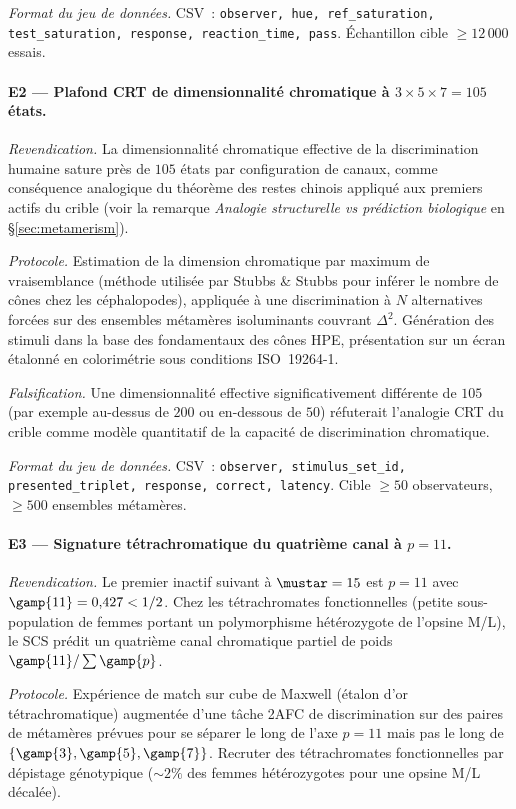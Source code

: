 \documentclass[12pt,a4paper]{article}
\begin{document}
\emph{Format du jeu de donn\'ees.} CSV~: \texttt{observer, hue,
ref\_saturation, test\_saturation, response, reaction\_time, pass}.
\'Echantillon cible $\geq 12\,000$ essais.

\paragraph{E2 --- Plafond CRT de dimensionnalit\'e chromatique
\`a $3 \times 5 \times 7 = 105$ \'etats.}
\emph{Revendication.} La dimensionnalit\'e chromatique effective de la
discrimination humaine sature pr\`es de $105$ \'etats par
configuration de canaux, comme cons\'equence analogique du th\'eor\`eme
des restes chinois appliqu\'e aux premiers actifs du crible (voir la
remarque \emph{Analogie structurelle vs pr\'ediction biologique} en
\S\ref{sec:metamerism}).

\emph{Protocole.} Estimation de la dimension chromatique par maximum
de vraisemblance (m\'ethode utilis\'ee par Stubbs \& Stubbs pour
inf\'erer le nombre de c\^ones chez les c\'ephalopodes), appliqu\'ee
\`a une discrimination \`a $N$ alternatives forc\'ees sur des
ensembles m\'etam\`eres isoluminants couvrant $\Delta^2$. G\'en\'eration
des stimuli dans la base des fondamentaux des c\^ones HPE, pr\'esentation
sur un \'ecran \'etalonn\'e en colorim\'etrie sous conditions
ISO~19264-1.

\emph{Falsification.} Une dimensionnalit\'e effective
significativement diff\'erente de $105$ (par exemple au-dessus de $200$
ou en-dessous de $50$) r\'efuterait l'analogie CRT du crible comme
mod\`ele quantitatif de la capacit\'e de discrimination chromatique.

\emph{Format du jeu de donn\'ees.} CSV~: \texttt{observer,
stimulus\_set\_id, presented\_triplet, response, correct, latency}.
Cible $\geq 50$ observateurs, $\geq 500$ ensembles m\'etam\`eres.

\paragraph{E3 --- Signature t\'etrachromatique du quatri\`eme canal \`a $p = 11$.}
\emph{Revendication.} Le premier inactif suivant \`a $\mustar = 15$
est $p = 11$ avec $\gamp{11} = 0{,}427 < 1/2$. Chez les
t\'etrachromates fonctionnelles (petite sous-population de femmes
portant un polymorphisme h\'et\'erozygote de l'opsine M/L), le SCS
pr\'edit un quatri\`eme canal chromatique partiel de poids
$\gamp{11}/\sum \gamp{p}$.

\emph{Protocole.} Exp\'erience de match sur cube de Maxwell
(\'etalon d'or t\'etrachromatique) augment\'ee d'une t\^ache 2AFC de
discrimination sur des paires de m\'etam\`eres pr\'evues pour se
s\'eparer le long de l'axe $p = 11$ mais pas le long de
$\{\gamp{3}, \gamp{5}, \gamp{7}\}$. Recruter des t\'etrachromates
fonctionnelles par d\'epistage g\'enotypique ($\sim 2\%$ des femmes
h\'et\'erozygotes pour une opsine M/L d\'ecal\'ee).
\end{document}
